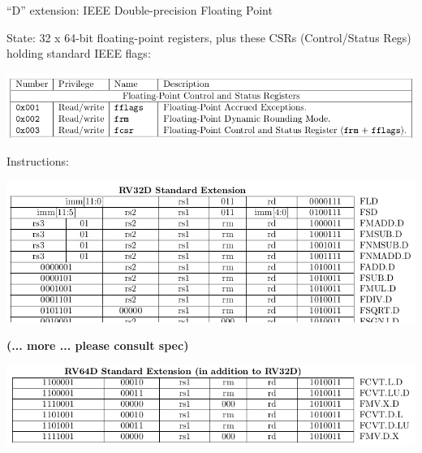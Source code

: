 \documentclass{article}
\begin{document}
\begin{center}
{\Huge
  ``D'' extension: IEEE Double-precision Floating Point}
\end{center}

\vspace*{0.1in}

\begin{center}
  \begin{minipage}{9.5in}

    {\Large State: 32 x 64-bit floating-point registers, plus these CSRs
      (Control/Status Regs) holding standard IEEE flags:}

    \begin{center}
      \includegraphics[width=7in]{Figs/UNPRIV_riscv-spec-20191213_p136_CSRs_FD.png}
    \end{center}

    \vspace*{0.1in}

    {\Large Instructions:}

    \begin{center}
      \includegraphics[width=7in]{Figs/UNPRIV_riscv-spec-20191213_p134_RV32D.png}

      \vspace*{1ex}

      {\large\bf (... more ... please consult spec)}

      \vspace*{0.2in}

      \includegraphics[width=7in]{Figs/UNPRIV_riscv-spec-20191213_p134_RV64D.png}
    \end{center}
  \end{minipage}
\end{center}
\end{document}
